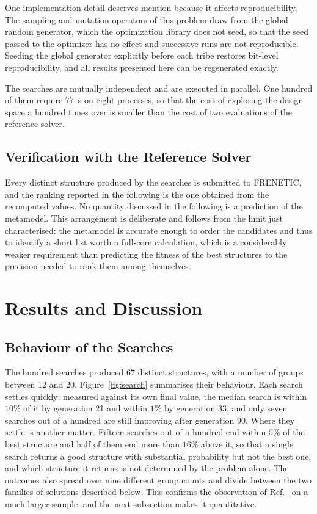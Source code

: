 \documentclass{style/nseJournal}
\begin{document}
One implementation detail deserves mention because it affects reproducibility.
The sampling and mutation operators of this problem draw from the global random
generator, which the optimization library does not seed, so that the seed passed
to the optimizer has no effect and successive runs are not reproducible.
Seeding the global generator explicitly before each tribe restores bit-level
reproducibility, and all results presented here can be regenerated exactly.

The searches are mutually independent and are executed in parallel. One hundred
of them require $77$~s on eight processes, so that the cost of exploring the
design space a hundred times over is smaller than the cost of two evaluations of
the reference solver.

\subsection{Verification with the Reference Solver}

Every distinct structure produced by the searches is submitted to FRENETIC, and
the ranking reported in the following is the one obtained from the recomputed
values. No quantity discussed in the following is a prediction of the metamodel.
This arrangement is deliberate and follows from the limit just characterised:
the metamodel is accurate
enough to order the candidates and thus to identify a short list worth a
full-core calculation, which is a considerably weaker requirement than
predicting the fitness of the best structures to the precision needed to rank
them among themselves.


\section{Results and Discussion}

\subsection{Behaviour of the Searches}

The hundred searches produced 67 distinct structures, with a number of groups
between 12 and 20. Figure~\ref{fig:search} summarises their behaviour. Each
search settles quickly: measured against its own final value, the median search
is within $10\%$ of it by generation 21 and within $1\%$ by generation 33, and
only seven searches out of a hundred are still improving after generation 90.
Where they settle is another matter. Fifteen searches out of a hundred end
within $5\%$ of the best structure and half of them end more than $16\%$ above
it, so that a single search returns a good structure with substantial
probability but not the best one, and which structure it returns is not
determined by the problem alone. The outcomes also spread over nine different
group counts and divide between the two families of solutions described below.
This confirms the observation of Ref.~\cite{prevMulti} on a much larger sample,
and the next subsection makes it quantitative.
\end{document}
